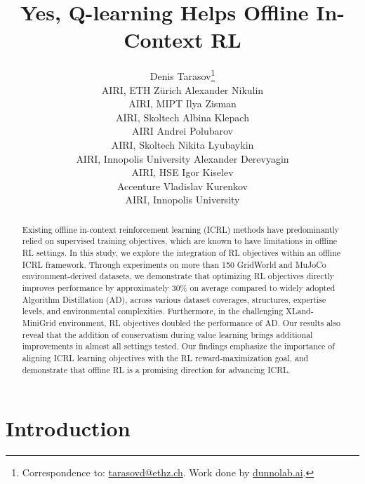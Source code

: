 \documentclass{article} %
\title{Yes, Q-learning Helps Offline In-Context RL}
\author{
Denis Tarasov\thanks{Correspondence to: \href{mailto:tarasovd@ethz.ch}{tarasovd@ethz.ch}. Work done by \href{https://dunnolab.ai}{dunnolab.ai}.} \\ AIRI, ETH Zürich \And 
Alexander Nikulin \\ AIRI, MIPT \And 
Ilya Zisman \\ AIRI, Skoltech \And 
Albina Klepach \\ AIRI \And 
Andrei Polubarov \\ AIRI, Skoltech \And 
Nikita Lyubaykin \\ AIRI, Innopolis University \And 
Alexander Derevyagin \\ AIRI, HSE \And 
Igor Kiselev \\ Accenture \And
Vladislav Kurenkov \\ AIRI, Innopolis University
}
\begin{document}
\maketitle

\begin{abstract}
Existing offline in-context reinforcement learning (ICRL) methods have predominantly relied on supervised training objectives, which are known to have limitations in offline RL settings. In this study, we explore the integration of RL objectives within an offline ICRL framework. Through experiments on more than 150 GridWorld and MuJoCo environment-derived datasets, we demonstrate that optimizing RL objectives directly improves performance by approximately 30\% on average compared to widely adopted Algorithm Distillation (AD), across various dataset coverages, structures, expertise levels, and environmental complexities. Furthermore, in the challenging XLand-MiniGrid environment, RL objectives doubled the performance of AD. Our results also reveal that the addition of conservatism during value learning brings additional improvements in almost all settings tested. Our findings emphasize the importance of aligning ICRL learning objectives with the RL reward-maximization goal, and demonstrate that offline RL is a promising direction for advancing ICRL.
\end{abstract}

\section{Introduction}
\end{document}
